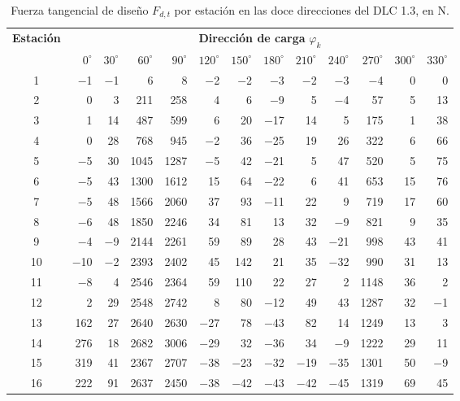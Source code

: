\begin{table}[H]
    \centering
    \footnotesize
    \setlength{\tabcolsep}{3.2pt}
    \caption{Fuerza tangencial de diseño $F_{d,t}$ por estación en las doce direcciones del DLC 1.3, en N.}
    \label{tab:anexo_dir_dlc13_t}
    \begin{tabular}{crrrrrrrrrrrr}
        \hline
        \textbf{Estación} & \multicolumn{12}{c}{\textbf{Dirección de carga} $\varphi_k$} \\
        \cline{2-13}
        & $0^\circ$ & $30^\circ$ & $60^\circ$ & $90^\circ$ & $120^\circ$ & $150^\circ$ & $180^\circ$ & $210^\circ$ & $240^\circ$ & $270^\circ$ & $300^\circ$ & $330^\circ$ \\
        \hline
        1 & $-$1 & $-$1 & 6 & 8 & $-$2 & $-$2 & $-$3 & $-$2 & $-$3 & $-$4 & 0 & 0 \\
        2 & 0 & 3 & 211 & 258 & 4 & 6 & $-$9 & 5 & $-$4 & 57 & 5 & 13 \\
        3 & 1 & 14 & 487 & 599 & 6 & 20 & $-$17 & 14 & 5 & 175 & 1 & 38 \\
        4 & 0 & 28 & 768 & 945 & $-$2 & 36 & $-$25 & 19 & 26 & 322 & 6 & 66 \\
        5 & $-$5 & 30 & 1045 & 1287 & $-$5 & 42 & $-$21 & 5 & 47 & 520 & 5 & 75 \\
        6 & $-$5 & 43 & 1300 & 1612 & 15 & 64 & $-$22 & 6 & 41 & 653 & 15 & 76 \\
        7 & $-$5 & 48 & 1566 & 2060 & 37 & 93 & $-$11 & 22 & 9 & 719 & 17 & 60 \\
        8 & $-$6 & 48 & 1850 & 2246 & 34 & 81 & 13 & 32 & $-$9 & 821 & 9 & 35 \\
        9 & $-$4 & $-$9 & 2144 & 2261 & 59 & 89 & 28 & 43 & $-$21 & 998 & 43 & 41 \\
        10 & $-$10 & $-$2 & 2393 & 2402 & 45 & 142 & 21 & 35 & $-$32 & 990 & 31 & 13 \\
        11 & $-$8 & 4 & 2546 & 2364 & 59 & 110 & 22 & 27 & 2 & 1148 & 36 & 2 \\
        12 & 2 & 29 & 2548 & 2742 & 8 & 80 & $-$12 & 49 & 43 & 1287 & 32 & $-$1 \\
        13 & 162 & 27 & 2640 & 2630 & $-$27 & 78 & $-$43 & 82 & 14 & 1249 & 13 & 3 \\
        14 & 276 & 18 & 2682 & 3006 & $-$29 & 32 & $-$36 & 34 & $-$9 & 1222 & 29 & 11 \\
        15 & 319 & 41 & 2367 & 2707 & $-$38 & $-$23 & $-$32 & $-$19 & $-$35 & 1301 & 50 & $-$9 \\
        16 & 222 & 91 & 2637 & 2450 & $-$38 & $-$42 & $-$43 & $-$42 & $-$45 & 1319 & 69 & 45 \\

\end{tabular}
\end{table}
